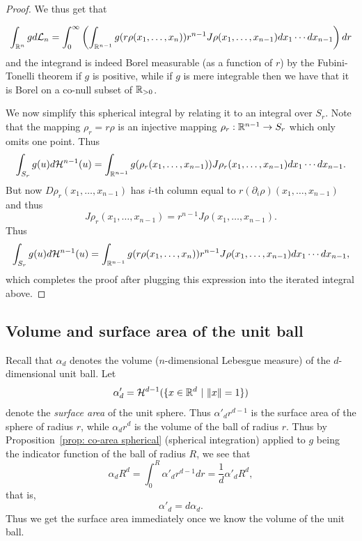 \documentclass[twoside, a4paper, 10pt]{amsart}
\begin{document}
\begin{proof}
We thus get that

$$\int_{\mathbb{R}^n} g d\mathcal{L}_n = \int_{0}^{\infty} \left( \int_{\mathbb{R}^{n-1}} g(r \rho(x_1, \ldots, x_n)) r^{n-1} J\rho(x_1, \ldots, x_{n-1}) dx_1 \cdots dx_{n-1} \right) dr$$ 
and the integrand is indeed Borel measurable (as a function of $r$) by the Fubini-Tonelli theorem if $g$ is positive, while if $g$ is mere integrable then we have that it is Borel on a co-null subset of $\mathbb{R}_{>0}$.

We now simplify this spherical integral by relating it to an integral over $S_r$. Note that the mapping $\rho_r = r \rho$ is an injective mapping $\rho_r:\mathbb{R}^{n-1} \to S_r$ which only omits one point. Thus 
$$\int_{S_r} g(u) d\mathcal{H}^{n-1}(u) = \int_{\mathbb{R}^{n-1}}  g (\rho_r(x_1, \ldots, x_{n-1})) J\rho_r(x_1, \ldots, x_{n-1}) dx_1 \cdots dx_{n-1} .$$ But now $D\rho_r(x_1, \ldots, x_{n-1})$ has $i$-th column equal to $r (\partial_i\rho)(x_1, \ldots, x_{n-1})$ and thus $$J\rho_r(x_1, \ldots, x_{n-1}) = r^{n-1} J\rho(x_1,\ldots, x_{n-1}).$$
Thus $$\int_{S_r} g(u) d\mathcal{H}^{n-1}(u) = \int_{\mathbb{R}^{n-1}} g(r \rho(x_1, \ldots, x_n)) r^{n-1} J\rho(x_1, \ldots, x_{n-1}) dx_1 \cdots dx_{n-1},$$ which completes the proof after plugging this expression into the iterated integral above. \end{proof}

\subsection{Volume and surface area of the unit ball}

Recall that $\alpha_d$ denotes the volume ($n$-dimensional Lebesgue measure) of the $d$-dimensional unit ball. Let $$\alpha'_d = \mathcal{H}^{d-1}(\{ x \in \mathbb{R}^d ~|~ \|x \| = 1\})$$ denote the \textit{surface area} of the unit sphere. Thus $\alpha'_d r^{d-1}$ is the surface area of the sphere of radius $r$, while $\alpha_d r^d$ is the volume of the ball of radius $r$. Thus by Proposition~\ref{prop: co-area spherical} (spherical integration) applied to $g$ being the indicator function of the ball of radius $R$, we see that $$\alpha_d R^d = \int_{0}^R \alpha'_d r^{d-1} dr = \frac{1}{d} \alpha'_d R^d,$$ that is, $$\alpha'_d = d \alpha_d.$$
Thus we get the surface area immediately once we know the volume of the unit ball.
\end{document}
